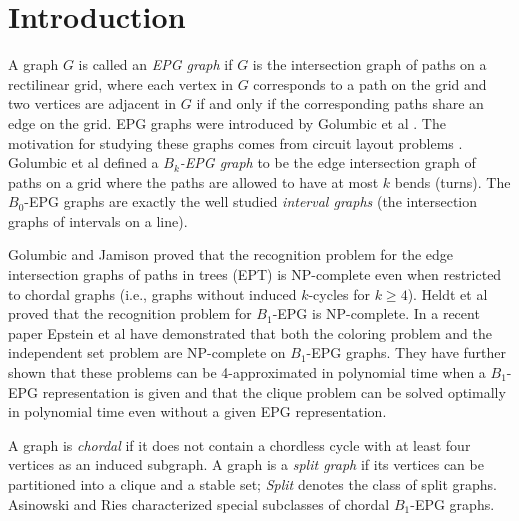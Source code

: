 \documentclass[11pt,3p,times]{elsarticle}
\begin{document}
\section{Introduction}
A graph $G$ is called an {\em EPG graph} if $G$ is  the
intersection graph of paths on a rectilinear grid, where each vertex in $G$
corresponds to a path on the grid and two vertices are adjacent in
$G$ if and only if the corresponding paths share an edge on the grid. EPG
graphs were introduced by Golumbic et al \cite{Gol2009}. The
motivation for studying these graphs comes from circuit layout
problems \cite{Ban1990}. Golumbic et al \cite{Gol2009} defined a {\em
$B_k$-EPG graph} to be the edge intersection graph of paths on a
grid where the paths are allowed to have at most $k$ bends
(turns). The $B_0$-EPG graphs are exactly the well studied {\em
interval graphs} (the intersection graphs of intervals on a line).

Golumbic and Jamison \cite{Gol1985}
proved that  the recognition problem for the edge intersection
graphs of paths in trees (EPT) is NP-complete even when restricted
to chordal graphs (i.e., graphs without induced $k$-cycles for $k \geq 4$). Heldt et al \cite{Hel2010} proved that the recognition problem for
$B_1$-EPG is NP-complete.
In a recent paper Epstein et al \cite{EpsteinGM13} have demonstrated that both the
coloring problem and the independent set problem are NP-complete on $B_1$-EPG graphs.
They have further shown that these problems can be 4-approximated in polynomial time
when a $B_1$-EPG representation is given and that the clique problem can be solved
optimally in polynomial time even without a given EPG representation.

A graph is {\em chordal} if it does not
contain a chordless cycle with at least four vertices as an
induced subgraph. A graph is a {\em split graph} if its vertices
can be partitioned into a clique and a stable set; {\em Split}
denotes the class of split graphs. Asinowski and
Ries \cite{Asi2012} characterized special subclasses of chordal
$B_1$-EPG graphs.
\end{document}
